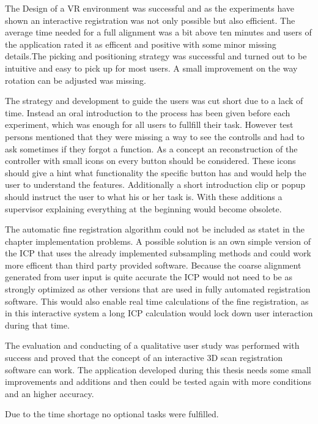 \documentclass[hyperref,english,bachelorofscience,bibnum]{cgvpub}
\begin{document}
The Design of a VR environment was successful and as the experiments have shown an interactive registration was not only possible but also efficient. The average time needed for a full alignment was a bit above ten minutes and users of the application rated it as efficent and positive with some minor missing details.The picking and positioning strategy was successful and turned out to be intuitive and easy to pick up for most users. A small improvement on the way rotation can be adjusted was missing.

The strategy and development to guide the users was cut short due to a lack of time. Instead an oral introduction to the process has been given before each experiment, which was enough for all users to fullfill their task. However test persons mentioned that they were missing a way to see the controlls and had to ask sometimes if they forgot a function. As a concept an reconstruction of the controller with small icons on every button should be considered. These icons should give a hint what functionality the specific button has and would help the user to understand the features. Additionally a short introduction clip or popup should instruct the user to what his or her task is. With these additions a supervisor explaining everything at the beginning would become obsolete.

The automatic fine registration algorithm could not be included as statet in the chapter implementation problems. A possible solution is an own simple version of the ICP that uses the already implemented subsampling methods and could work more efficent than third party provided software. Because the coarse alignment generated from user input is quite accurate the ICP would not need to be as strongly optimized as other versions that are used in fully automated registration software. This would also enable real time calculations of the fine registration, as in this interactive system a long ICP calculation would lock down user interaction during that time.

The evaluation and conducting of a qualitative user study was performed with success and proved that the concept of an interactive 3D scan registration software can work. The application developed during this thesis needs some small improvements and additions and then could be tested again with more conditions and an higher accuracy.

Due to the time shortage no optional tasks were fulfilled.
\end{document}
